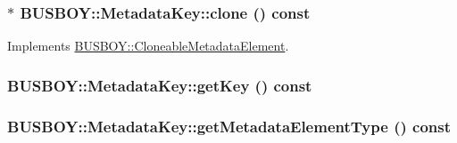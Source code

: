 \label{classBUSBOY_1_1MetadataKey_ad6cd3c3e919a8f3bffa8df52e04ed1a1}
\hypertarget{classBUSBOY_1_1MetadataKey_a6b3f94f3bc74ee43507c3c35362044dd}{
\subsubsection[{clone}]{ $\ast$ BUSBOY::MetadataKey::clone () const}}
\label{classBUSBOY_1_1MetadataKey_a6b3f94f3bc74ee43507c3c35362044dd}


Implements \hyperlink{classBUSBOY_1_1CloneableMetadataElement_af09790fd6aa07e67fc8c2a0a8cb09291}{BUSBOY::CloneableMetadataElement}.\hypertarget{classBUSBOY_1_1MetadataKey_a39ec4c0784cac06b78a48011dfcdb23b}{
\subsubsection[{getKey}]{ BUSBOY::MetadataKey::getKey () const}}
\label{classBUSBOY_1_1MetadataKey_a39ec4c0784cac06b78a48011dfcdb23b}
\hypertarget{classBUSBOY_1_1MetadataKey_a1e61e743e965046f08839d820f2d8320}{
\subsubsection[{getMetadataElementType}]{ BUSBOY::MetadataKey::getMetadataElementType () const}}
\label{classBUSBOY_1_1MetadataKey_a1e61e743e965046f08839d820f2d8320}



